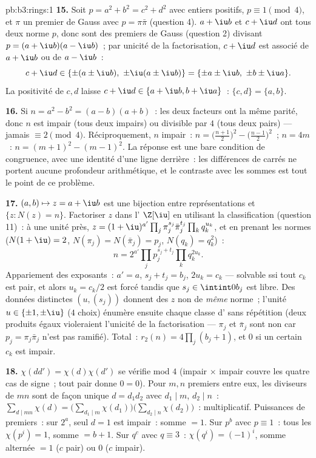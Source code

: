\begin{solution}{pb:b3:rings:1}
\textbf{15.} Soit $p = a^2 + b^2 = c^2 + d^2$ avec entiers
positifs, $p \equiv 1 \pmod 4$, et $\pi$ un premier de Gauss
avec $p = \pi\bar\pi$ (question 4). $a + \iu b$ et $c + \iu d$
ont tous deux norme $p$, donc sont des premiers de Gauss
(question 2) divisant $p = (a+\iu b)(a - \iu b)$~; par unicité
de la factorisation, $c + \iu d$ est associé de $a + \iu b$ ou
de $a - \iu b$~:
\[
c + \iu d \in \{\pm(a \pm \iu b),\ \pm\iu(a \pm \iu b)\}
= \{\pm a \pm \iu b,\ \pm b \pm \iu a\}.
\]
La positivité de $c, d$ laisse $c + \iu d \in \{a + \iu b, b +
\iu a\}$~: $\{c, d\} = \{a, b\}$.

\textbf{16.} Si $n = a^2 - b^2 = (a-b)(a+b)$~: les deux facteurs
ont la même parité, donc $n$ est impair (tous deux impairs) ou
divisible par $4$ (tous deux pairs) --- jamais $\equiv 2 \pmod
4$. Réciproquement, $n$ impair~: $n = \bigl(\frac{n+1}2\bigr)^2
- \bigl(\frac{n-1}2\bigr)^2$~; $n = 4m$~: $n = (m+1)^2 -
(m-1)^2$. La réponse est une bare condition de congruence, avec
une identité d'une ligne derrière~: les différences de carrés
ne portent aucune profondeur arithmétique, et le contraste avec
les sommes est tout le point de ce problème.

\textbf{17.} $(a, b) \mapsto z = a + \iu b$ est une bijection
entre représentations et $\{z : N(z) = n\}$. Factoriser $z$ dans
l' $\Z[\iu]$ en utilisant la classification (question 11)~: à
une unité près, $z = (1+\iu)^{a'}\prod_j\pi_j^{s_j}\bar\pi_j^{t_j}
\prod_kq_k^{u_k}$, et en prenant les normes ($N(1+\iu) = 2$,
$N(\pi_j) = N(\bar\pi_j) = p_j$, $N(q_k) = q_k^2$)~:
\[
n = 2^{a'}\prod_jp_j^{s_j + t_j}\prod_kq_k^{2u_k} .
\]
Appariement des exposants~: $a' = a$, $s_j + t_j = b_j$, $2u_k =
c_k$ --- solvable ssi tout $c_k$ est pair, et alors $u_k =
c_k/2$ est forcé tandis que $s_j \in \intint0{b_j}$ est libre.
Des données distinctes $(u, (s_j))$ donnent des $z$ non 
de \emph{même} norme~; l'unité $u \in \{\pm1, \pm\iu\}$ ($4$
choix) énumère ensuite chaque classe d' sans répétition
(deux produits égaux violeraient l'unicité de la factorisation
--- $\pi_j$ et $\bar\pi_j$ sont non  car $p_j =
\pi_j\bar\pi_j$ n'est pas ramifié). Total~: $r_2(n) =
4\prod_j(b_j + 1)$, et $0$ si un certain $c_k$ est impair.

\textbf{18.} $\chi(dd') = \chi(d)\chi(d')$ se vérifie mod $4$
(impair $\times$ impair couvre les quatre cas de signe~; tout
pair donne $0 = 0$). Pour $m, n$ premiers entre eux, les
diviseurs de $mn$ sont de façon unique $d = d_1d_2$ avec $d_1
\mid m$, $d_2 \mid n$~: $\sum_{d \mid mn}\chi(d) =
\bigl(\sum_{d_1\mid m}\chi(d_1)\bigr)\bigl(\sum_{d_2\mid
n}\chi(d_2)\bigr)$~: multiplicatif. Puissances de premiers~:
sur $2^a$, seul $d = 1$ est impair~: somme $= 1$. Sur $p^b$
avec $p \equiv 1$~: tous les $\chi(p^i) = 1$, somme $= b + 1$.
Sur $q^c$ avec $q \equiv 3$~: $\chi(q^i) = (-1)^i$, somme
alternée $= 1$ ($c$ pair) ou $0$ ($c$ impair).


\end{solution}
